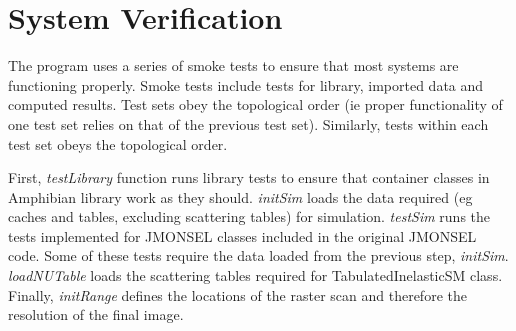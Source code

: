 \chapter{System Verification}\label{sec:verify}
The program uses a series of smoke tests to ensure that most systems are functioning properly. Smoke tests include tests for library, imported data and computed results. Test sets obey the topological order (ie proper functionality of one test set relies on that of the previous test set). Similarly, tests within each test set obeys the topological order.

First, \textit{testLibrary} function runs library tests to ensure that container classes in Amphibian library work as they should. \textit{initSim} loads the data required (eg caches and tables, excluding scattering tables) for simulation. \textit{testSim} runs the tests implemented for JMONSEL classes included in the original JMONSEL code. Some of these tests require the data loaded from the previous step, \textit{initSim}. \textit{loadNUTable} loads the scattering tables required for TabulatedInelasticSM class. Finally, \textit{initRange} defines the locations of the raster scan and therefore the resolution of the final image.
